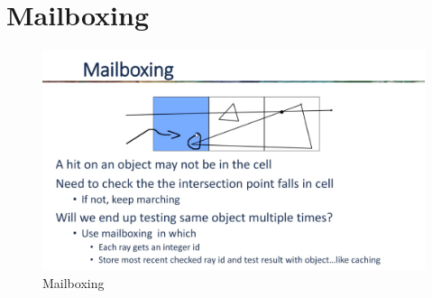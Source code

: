 \documentclass[letterpaper, 11pt]{article}
\begin{document}
  \section{Mailboxing}

    \begin{figure}[H]
      \centering
      \caption{Mailboxing}
      \includegraphics[width=0.7\columnwidth]{images/mailboxing.png}
    \end{figure}
\end{document}

